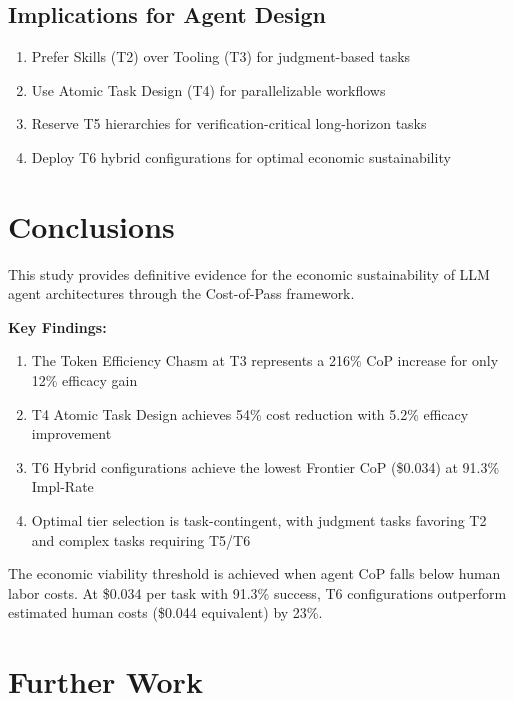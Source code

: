 \documentclass[11pt]{article}
\begin{document}
\subsection{Implications for Agent Design}
\begin{enumerate}
    \item Prefer Skills (T2) over Tooling (T3) for judgment-based tasks
    \item Use Atomic Task Design (T4) for parallelizable workflows
    \item Reserve T5 hierarchies for verification-critical long-horizon tasks
    \item Deploy T6 hybrid configurations for optimal economic sustainability
\end{enumerate}

\section{Conclusions}

This study provides definitive evidence for the economic sustainability of LLM agent architectures through the Cost-of-Pass framework.

\textbf{Key Findings:}
\begin{enumerate}
    \item The Token Efficiency Chasm at T3 represents a 216\% CoP increase for only 12\% efficacy gain
    \item T4 Atomic Task Design achieves 54\% cost reduction with 5.2\% efficacy improvement
    \item T6 Hybrid configurations achieve the lowest Frontier CoP (\$0.034) at 91.3\% Impl-Rate
    \item Optimal tier selection is task-contingent, with judgment tasks favoring T2 and complex tasks requiring T5/T6
\end{enumerate}

The economic viability threshold is achieved when agent CoP falls below human labor costs. At \$0.034 per task with 91.3\% success, T6 configurations outperform estimated human costs (\$0.044 equivalent) by 23\%.

\section{Further Work}
\end{document}
